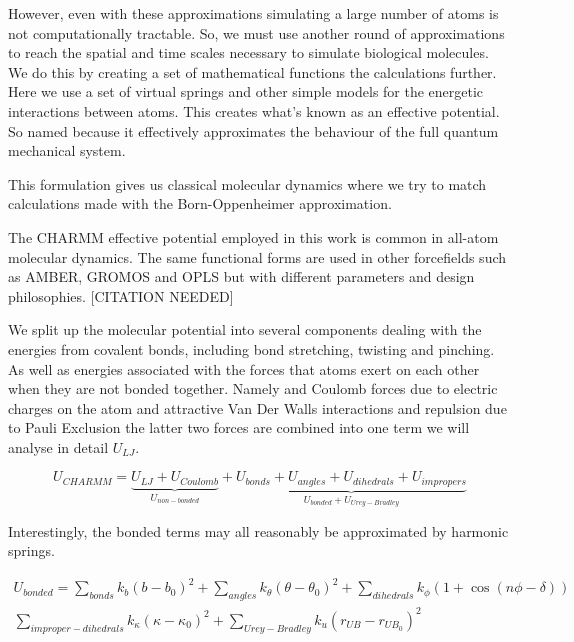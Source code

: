 However, even with these approximations simulating a large number of atoms is not computationally tractable. So, we must use another round of approximations to reach the spatial and time scales necessary to simulate biological molecules. We do this by creating a set of mathematical functions the calculations further. Here we use a set of virtual springs and other simple models for the energetic interactions between atoms. This creates what's known as an effective potential. So named because it effectively approximates the behaviour of the full quantum mechanical system.

This formulation gives us classical molecular dynamics where we try to match calculations made with the Born-Oppenheimer approximation. 

The CHARMM effective potential employed in this work is common in all-atom molecular dynamics. The same  functional forms are used in other forcefields such as AMBER, GROMOS and OPLS but with different parameters and design philosophies. [CITATION NEEDED]

We split up the molecular potential into several components dealing with the energies from covalent bonds, including bond stretching, twisting and pinching. As well as energies associated with the forces that atoms exert on each other when they are not bonded together. Namely and Coulomb forces due to electric charges on the atom and attractive Van Der Walls interactions and repulsion due to Pauli Exclusion the latter two forces are combined into one term we will analyse in detail $U_{LJ}$.

\begin{equation}
	U_{CHARMM} = \underbrace{U_{LJ} + U_{Coulomb}}_{U_{non-bonded}} + \underbrace{U_{bonds} + U_{angles} + U_{dihedrals} + U_{impropers}}_{U_{bonded} + U_{Urey-Bradley}}
\end{equation}

Interestingly, the bonded terms may all reasonably be approximated by harmonic springs. 

\begin{equation}\label{bonded_eqs}
	\begin{aligned}
	U_{bonded} = \sum_{bonds} k_{b} (b-b_0)^2 + \sum_{angles} k_\theta(\theta-\theta_0)^2 + \sum_{dihedrals} k_\phi (1+\cos(n \phi - \delta)) \\ \sum_{improper-dihedrals}  k_{\kappa} (\kappa - \kappa_0)^2 + \sum_{Urey-Bradley} k_u(r_{UB}-r_{UB_0})^2 
\end{aligned}
\end{equation}

